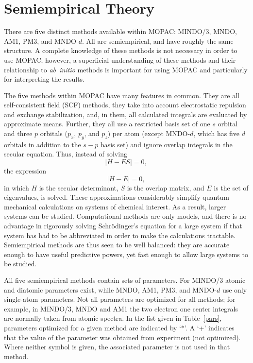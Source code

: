 \section{Semiempirical Theory}\label{semit}
There are five distinct methods available within MOPAC: MINDO/3, MNDO, AM1,
PM3, and MNDO-$d$. All are semiempirical, and have roughly the same structure.
A complete knowledge of these methods is not necessary in order to use MOPAC;
however, a superficial understanding of these methods and their relationship to
{\em ab~initio} methods is important for using MOPAC and particularly for
interpreting the results.

The five methods within MOPAC have many features in common. They are all
self-consistent field (SCF) methods, they take into account electrostatic
repulsion and exchange stabilization, and, in them, all calculated integrals
are evaluated by approximate means. Further, they all use a restricted basis
set of one $s$ orbital and three $p$ orbitals ($p_x$, $p_y$, and $p_z$) per
atom (except MNDO-$d$, which has five $d$ orbitals in addition to the $s-p$
basis set) and ignore overlap  integrals in the secular equation. Thus, instead
of solving
$$
|H-ES| = 0,
$$
the expression
$$
|H-E| = 0,
$$
in which $H$ is the secular determinant, $S$ is the overlap matrix, and $E$ is
the set of eigenvalues, is solved. These approximations considerably simplify
quantum mechanical calculations on systems of chemical interest. As a result,
larger systems can be studied. Computational methods are only models, and there
is no advantage in rigorously solving Schr\"{o}dinger's equation for a large
system if that system has had to be abbreviated in order to make the
calculations tractable. Semiempirical methods are thus seen to be well
balanced: they are accurate enough to have useful predictive powers, yet fast
enough to allow large systems to be studied.

All five semiempirical methods contain sets of parameters. For MINDO/3 atomic
and diatomic parameters exist, while MNDO, AM1, PM3, and MNDO-$d$ use only
single-atom parameters. Not all parameters are optimized for all methods; for
example, in MINDO/3, MNDO and AM1 the two electron one center integrals are
normally taken from atomic spectra. In the list given in Table~\ref{pars},
parameters optimized for a given method are indicated by `$*$'. A `+' indicates
that the value of the parameter was obtained from experiment (not optimized).
Where neither symbol is given, the associated parameter is not used in that
method.

